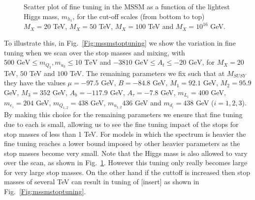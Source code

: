 \documentclass[preprint,amsmath,amssymb,aps,superscriptaddress,prd,showpacs,floatfix]{revtex4-1}
\begin{document}
\begin{figure}[h]
\begin{center}
\caption{Scatter plot of fine tuning in the MSSM as a function of
the lightest Higgs mass, $m_{h_1}$, for the cut-off scales (from 
bottom to top) $M_X=20$ TeV, $M_X=50$ TeV, $M_X=100$ TeV and $M_X=10^{16}$ GeV.}
\label{Fig:mssmhiggstuning}
\end{center}
\end{figure}
To illustrate this, in Fig.~\ref{Fig:mssmstoptuning} we show the variation in fine
tuning when we scan over the
stop masses and mixing, with $500 \textrm{ GeV} \leq
m_{Q_3},m_{u_3}\leq 10\textrm{ TeV}$ and $-3810\textrm{ GeV}\leq
A_t\leq -20\textrm{ GeV}$, for $M_X=20$ TeV, $50$ TeV and $100$ TeV.
The remaining parameters we fix such that at $M_{SUSY}$ they have the values $\mu=-97.5$ GeV, $B=-84.8$ GeV,
$M_1=92.1$ GeV, $M_2=95.9$ GeV, $M_3=352$ GeV, $A_b=-117.9$ GeV, $A_\tau=-7.8$ GeV, $m_{L_i}=400$ GeV, $m_{e_i}=204$ GeV,
$m_{Q_{1,2}}=438$ GeV, $m_{u_{1,2}}436$ GeV and $m_{d_i}=438$ GeV ($i=1,2,3$). By making this choice for the 
remaining parameters we ensure that fine tuning due to each is small, allowing us to see the fine tuning
impact of the stops for stop masses of less than 1 TeV. For models in which the spectrum is heavier the fine tuning
reaches a lower bound imposed by other heavier parameters as the stop masses become very small.
Note that the Higgs mass is also allowed to vary over the scan, as shown in 
Fig.~\ref{Fig:mssmhiggstuning}.
However this tuning only really becomes large for very large stop
masses.  On the other hand if the cuttoff is increased then stop masses of
several TeV can result in tuning of [insert] as shown in
Fig.~\ref{Fig:mssmstoptuning}.\\ \\
\end{document}
